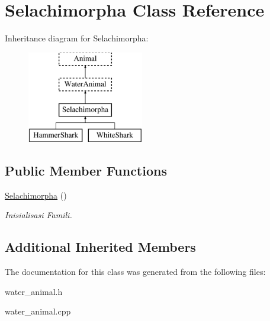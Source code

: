 \hypertarget{class_selachimorpha}{}\section{Selachimorpha Class Reference}
\label{class_selachimorpha}
Inheritance diagram for Selachimorpha\+:\begin{figure}[H]
\begin{center}
\leavevmode
\includegraphics[height=4.000000cm]{class_selachimorpha}
\end{center}
\end{figure}
\subsection*{Public Member Functions}
\begin{DoxyCompactItemize}
\item 
\hyperlink{class_selachimorpha_a7dc1eaa2035daa6e43436c2249ab6c51}{Selachimorpha} ()\hypertarget{class_selachimorpha_a7dc1eaa2035daa6e43436c2249ab6c51}{}\label{class_selachimorpha_a7dc1eaa2035daa6e43436c2249ab6c51}

\begin{DoxyCompactList}\small\item\em Inisialisasi Famili. \end{DoxyCompactList}\end{DoxyCompactItemize}
\subsection*{Additional Inherited Members}


The documentation for this class was generated from the following files\+:\begin{DoxyCompactItemize}
\item 
water\+\_\+animal.\+h\item 
water\+\_\+animal.\+cpp\end{DoxyCompactItemize}
